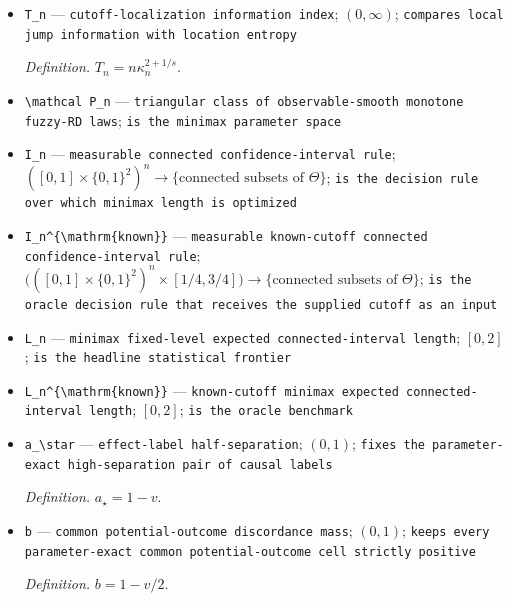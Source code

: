 \documentclass{article}
\begin{document}
\begin{itemize}
  \par\smallskip\noindent\emph{Definition.} \(\rho_n=n^{-s/(2s+1)}\).
  \item \texttt{T\_\allowbreak{}n} --- \texttt{cutoff-\allowbreak{}localization information index}; \((0,\infty)\); \texttt{compares local jump information with location entropy}
  \par\smallskip\noindent\emph{Definition.} \(T_n=n\kappa_n^{2+1/s}\).
  \item \texttt{\textbackslash{}\allowbreak{}mathcal P\_\allowbreak{}n} --- \texttt{triangular class of observable-\allowbreak{}smooth monotone fuzzy-\allowbreak{}RD laws}; \texttt{is the minimax parameter space}
  \item \texttt{I\_\allowbreak{}n} --- \texttt{measurable connected confidence-\allowbreak{}interval rule}; \(([0,1]\times\{0,1\}^2)^n\to\{\text{connected subsets of }\Theta\}\); \texttt{is the decision rule over which minimax length is optimized}
  \item \texttt{I\_\allowbreak{}n\textasciicircum{}\{\textbackslash{}\allowbreak{}mathrm\{known\}\allowbreak{}\}\allowbreak{}} --- \texttt{measurable known-\allowbreak{}cutoff connected confidence-\allowbreak{}interval rule}; \(\bigl(([0,1]\times\{0,1\}^2)^n\times[1/4,3/4]\bigr)\to\{\text{connected subsets of }\Theta\}\); \texttt{is the oracle decision rule that receives the supplied cutoff as an input}
  \item \texttt{L\_\allowbreak{}n} --- \texttt{minimax fixed-\allowbreak{}level expected connected-\allowbreak{}interval length}; \([0,2]\); \texttt{is the headline statistical frontier}
  \item \texttt{L\_\allowbreak{}n\textasciicircum{}\{\textbackslash{}\allowbreak{}mathrm\{known\}\allowbreak{}\}\allowbreak{}} --- \texttt{known-\allowbreak{}cutoff minimax expected connected-\allowbreak{}interval length}; \([0,2]\); \texttt{is the oracle benchmark}
  \item \texttt{a\_\allowbreak{}\textbackslash{}\allowbreak{}star} --- \texttt{effect-\allowbreak{}label half-\allowbreak{}separation}; \((0,1)\); \texttt{fixes the parameter-\allowbreak{}exact high-\allowbreak{}separation pair of causal labels}
  \par\smallskip\noindent\emph{Definition.} \(a_\star=1-v\).
  \item \texttt{b} --- \texttt{common potential-\allowbreak{}outcome discordance mass}; \((0,1)\); \texttt{keeps every parameter-\allowbreak{}exact common potential-\allowbreak{}outcome cell strictly positive}
  \par\smallskip\noindent\emph{Definition.} \(b=1-v/2\).

\end{itemize}
\end{document}
